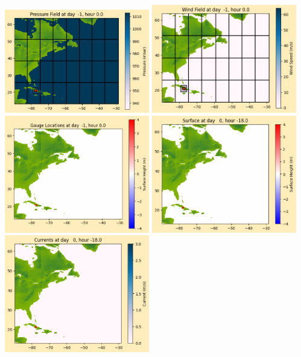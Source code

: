\documentclass[11pt]{article}
\begin{document}
\includegraphics[width=0.475\textwidth]{frame0008fig1012.png}
\vskip 10pt 
\includegraphics[width=0.475\textwidth]{frame0008fig1013.png}
\includegraphics[width=0.475\textwidth]{frame0008fig1014.png}
\vskip 10pt 
\includegraphics[width=0.475\textwidth]{frame0009fig1001.png}
\includegraphics[width=0.475\textwidth]{frame0009fig1002.png}
\end{document}
